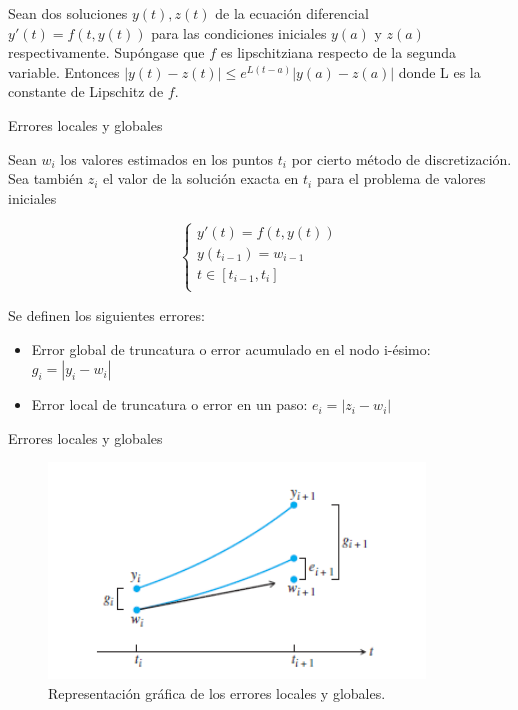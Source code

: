 		\begin{frame}{}		
				\begin{theorem} \label{theorem:desigualdad-sols}
					Sean dos soluciones $y(t), z(t)$ de la ecuación diferencial $y'(t) = f(t,y(t))$ para las condiciones iniciales $y(a)$ y $z(a)$ respectivamente. Supóngase que $f$ es lipschitziana respecto de la segunda variable. Entonces $|y(t)-z(t)| \leq e^{L(t-a)}|y(a)-z(a)|$ donde L es la constante de Lipschitz de $f$.
				\end{theorem}						
		\end{frame}
				
		\begin{frame}{Errores locales y globales}		
			\begin{definition}
				Sean $w_i$ los valores estimados en los puntos $t_i$ por cierto método de discretización. Sea también $z_i$ el valor de la solución exacta en $t_i$ para el problema de valores iniciales
		
				\begin{equation}
					\begin{cases}
					y'(t) = f(t,y(t)) \\
					y(t_{i-1}) = w_{i-1} \\
					t \in [t_{i-1},t_{i}] \\
					\end{cases}
				\end{equation}
		
				Se definen los siguientes errores:
		
				\begin{itemize}
					\item Error global de truncatura o error acumulado en el nodo i-ésimo: $g_i=|y_i - w_i|$
					\item Error local de truncatura o error en un paso: $e_i = |z_i - w_i|$
				\end{itemize}
			\end{definition}				
		\end{frame}
		
		\begin{frame}{Errores locales y globales}		
			\begin{figure}[h]
				\centering
				\includegraphics[width=10cm]{./Images/error-euler.png}
				\caption{Representación gráfica de los errores locales y globales.}
				\label{fig:error}
			\end{figure}	
		\end{frame}
		

